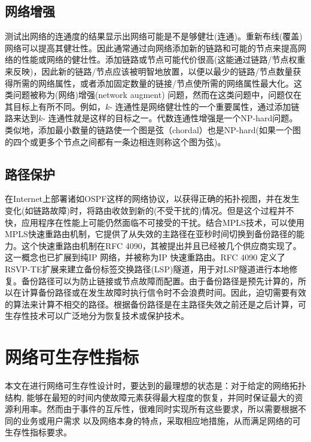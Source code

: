 \subsection{网络增强}
测试出网络的连通度的结果显示出网络可能是不是够健壮(连通)。重新布线(覆盖)网络可以提高其健壮性\cite{van2010influence}。因此通常通过向网络添加新的链路和可能的节点来提高网络的性能或网络的健壮性。添加链路或节点可能代价很高(这能通过链路/节点权重来反映)，因此新的链路/节点应该被明智地放置，以便以最少的链路/节点数量获得所需的网络属性，或者添加固定数量的链接/节点使所需的网络属性最大化。这类问题被称为(网络)增强(network augment) 问题，然而在这类问题中，问题仅在其目标上有所不同。例如，$k$- 连通性是网络健壮性的一个重要属性，通过添加链路来达到$k$- 连通性就是这样的目标之一。代数连通性增强是一个NP-hard问题\cite{mosk2008maximum}。 类似地，添加最小数量的链路使一个图是弦（chordal）也是NP-hard\cite{yannakakis1981computing}(如果一个图的四个或更多个节点之间都有一条边相连则称这个图为弦)。
\subsection{路径保护}
在Internet上部署诸如OSPF这样的网络协议，以获得正确的拓扑视图，并在发生变化(如链路故障)时，将路由收敛到新的(不受干扰的)情况。但是这个过程并不快，应用程序在性能上可能仍然面临不可接受的干扰。结合MPLS技术，可以使用MPLS快速重路由机制，它提供了从失效的主路径在亚秒时间切换到备份路径的能力。这个快速重路由机制在RFC 4090\cite{pan2005fast}，其被提出并且已经被几个供应商实现了。这一概念也已扩展到纯IP 网络，并被称为IP 快速重路由\cite{shand2010ip}。RFC 4090 定义了RSVP-TE扩展来建立备份标签交换路径(LSP)隧道，用于对LSP隧道进行本地修复。备份路径可以为防止链接或节点故障而配置。由于备份路径是预先计算的，所以在计算备份路径或在发生故障时执行信令时不会浪费时间。因此，迫切需要有效的算法来计算不相交的路径。根据备份路径是在主路径失效之前还是之后计算，可生存性技术可以广泛地分为恢复技术或保护技术。

\section{网络可生存性指标}
本文在进行网络可生存性设计时，要达到的最理想的状态是：对于给定的网络拓扑结构, 能够在最短的时间内使故障元素获得最大程度的恢复，并同时保证最大的资源利用率。然而由于事件的互斥性，很难同时实现所有这些要求，所以需要根据不同的业务或用户需求 以及网络本身的特点，采取相应地措施，从而满足网络的可生存性指标要求。

